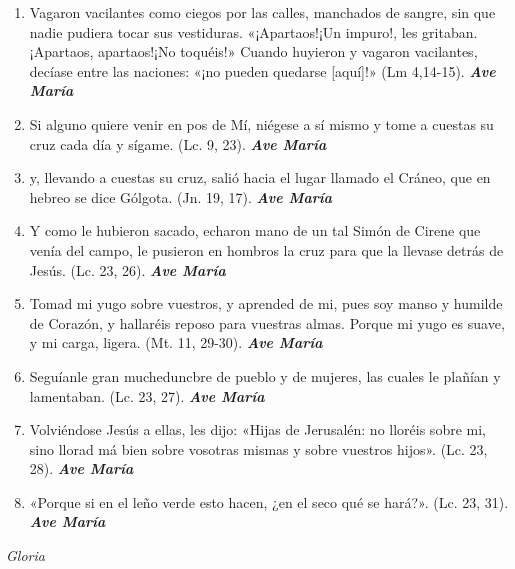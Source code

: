 \documentclass[a4paper,11pt, oneside]{report}
\begin{document}
{{\begin{enumerate}
        \item Vagaron vacilantes como ciegos por las calles, manchados de sangre, sin que nadie pudiera tocar sus vestiduras. «¡Apartaos!¡Un impuro!,
        les gritaban. ¡Apartaos, apartaos!¡No toquéis!» Cuando huyieron y vagaron vacilantes, decíase entre las naciones: «¡no pueden quedarse [aquí]!» 
        (Lm 4,14-15). \textbf{\textit{Ave María}}

        \item Si alguno quiere venir en pos de Mí, niégese a sí mismo y tome a cuestas su cruz cada día y sígame. (Lc. 9, 23). \textbf{\textit{Ave María}}

        \item y, llevando a cuestas su cruz, salió hacia el lugar llamado el Cráneo, que en hebreo se dice Gólgota. (Jn. 19, 17). \textbf{\textit{Ave María}}

        \item Y como le hubieron sacado, echaron mano de un tal Simón de Cirene que venía del campo, le pusieron en hombros la cruz para que la llevase
        detrás de Jesús. (Lc. 23, 26). \textbf{\textit{Ave María}}

        \item Tomad mi yugo sobre vuestros, y aprended de mi, pues soy manso y humilde de Corazón, y hallaréis reposo para vuestras almas.
        Porque mi yugo es suave, y mi carga, ligera. (Mt. 11, 29-30). \textbf{\textit{Ave María}}

        \item Seguíanle gran mucheduncbre de pueblo y de mujeres, las cuales le plañían y lamentaban. (Lc. 23, 27). \textbf{\textit{Ave María}}

        \item Volviéndose Jesús a ellas, les dijo: «Hijas de Jerusalén: no lloréis sobre mi, sino llorad má bien sobre vosotras mismas y sobre
        vuestros hijos». (Lc. 23, 28). \textbf{\textit{Ave María}}

        \item «Porque si en el leño verde esto hacen, ¿en el seco qué se hará?». (Lc. 23, 31). \textbf{\textit{Ave María}} 

      \end{enumerate}
      
      \indent\textit{Gloria} \par      

}}
\end{document}
